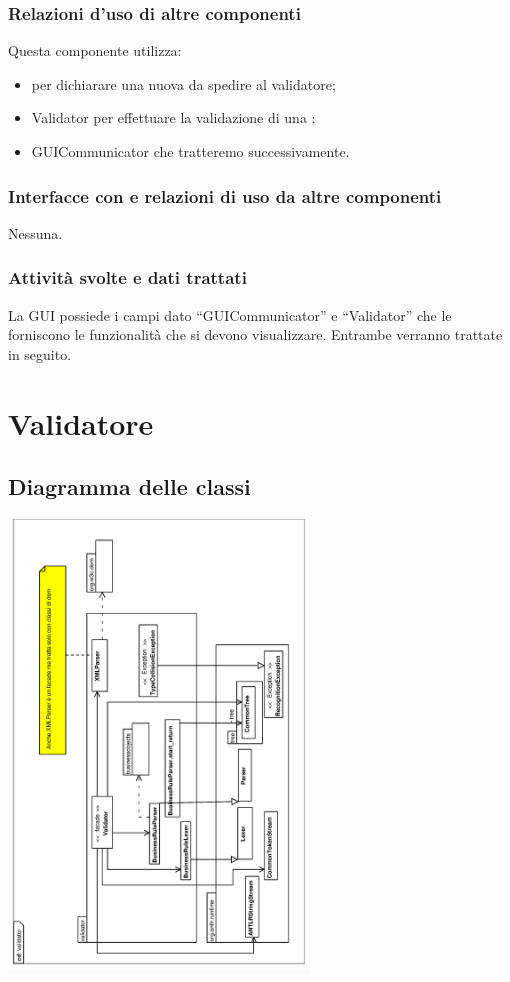 \documentclass[11pt,titlepage,a4paper]{report}
\begin{document}
\subsubsection{Relazioni d'uso di altre componenti}
Questa componente utilizza:
\begin{itemize}
 \item \BR per dichiarare una nuova \br da spedire al validatore;
 \item Validator per effettuare la validazione di una \br;
 \item GUICommunicator che tratteremo successivamente.
\end{itemize}
\subsubsection{Interfacce con e relazioni di uso da altre componenti}
Nessuna.
\subsubsection{Attivit\`a svolte e dati trattati}
La GUI possiede i campi dato ``GUICommunicator'' e ``Validator'' che le forniscono le funzionalit\`a che si devono visualizzare. Entrambe verranno trattate in seguito.

\section{Validatore}
\subsection{Diagramma delle classi}
\begin{center}
\includegraphics[width=0.6\textwidth, angle=-90]{DiagrammaClassi/validator.eps}
\end{center}
\end{document}
